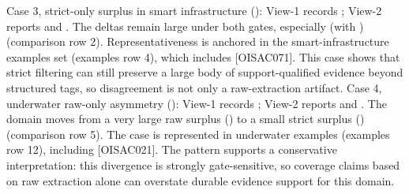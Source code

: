 {}Case 3, strict-only surplus in smart infrastructure (): View-1 records ; View-2 reports  and . The deltas remain large under both gates, especially  (with ) (comparison row \markdownRendererHash{}2). Representativeness is anchored in the smart-infrastructure  examples set (examples row \markdownRendererHash{}4), which includes  [O\markdownRendererUnderscore{}ISAC\markdownRendererUnderscore{}071]. This case shows that strict filtering can still preserve a large body of support-qualified evidence beyond structured tags, so disagreement is not only a raw-extraction artifact.\markdownRendererParagraphSeparator
{}Case 4, underwater raw-only asymmetry (): View-1 records ; View-2 reports  and . The domain moves from a very large raw surplus () to a small strict surplus () (comparison row \markdownRendererHash{}5). The case is represented in underwater  examples (examples row \markdownRendererHash{}12), including  [O\markdownRendererUnderscore{}ISAC\markdownRendererUnderscore{}021]. The pattern supports a conservative interpretation: this divergence is strongly gate-sensitive, so coverage claims based on raw extraction alone can overstate durable evidence support for this domain.\markdownRendererParagraphSeparator
